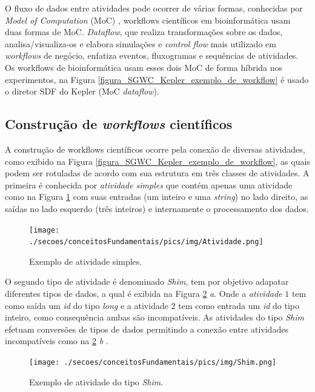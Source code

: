 O fluxo de dados entre atividades pode ocorrer de várias formas, conhecidas por \emph{Model of Computation} (MoC) \cite{Ludascher2006}, workflows científicos em bioinformática usam duas formas de MoC. \emph{Dataflow}, que realiza transformações sobre os dados, analisa/visualiza-os e elabora simulações e \emph{control flow} mais utilizado em \emph{workflows} de negócio, enfatiza eventos, fluxogramas e sequências de atividades. Os workflows de bioinformática usam esses dois MoC de forma híbrida nos experimentos, na Figura \ref{figura_SGWC_Kepler_exemplo_de_workflow} é usado o diretor SDF do Kepler (MoC \emph{dataflow}).

\subsection{Construção de \emph{workf\mbox{}lows} científ\mbox{}icos}
A construção de workflows científicos ocorre pela conexão de diversas atividades, como exibido na Figura \ref{figura_SGWC_Kepler_exemplo_de_workflow}, as quais podem ser rotuladas de acordo com sua estrutura em três classes de atividades. A primeira é conhecida por \emph{atividade simples} que contém apenas uma atividade  \cite{Garijo2012} como na Figura \ref{figura_atividade_simples} com suas entradas (um inteiro e uma \emph{string}) no lado direito, as saídas no lado esquerdo (três inteiros) e internamente o processamento dos dados.
\begin{figure}[!htb]
    \centering  
    \caption{Exemplo de atividade simples.}
    \texttt{[image: ./secoes/conceitosFundamentais/pics/img/Atividade.png]}    
	\label{figura_atividade_simples}
\end{figure}

O segundo tipo de atividade é denominado \emph{Shim}, tem por objetivo adapatar diferentes tipos de dados, a qual é exibida na Figura \ref{figura_atividade_shim} \emph{a}. Onde a \emph{atividade} \(1\) tem como saída um \emph{id} do tipo \emph{long} e a atividade \(2\) tem como entrada um \emph{id} do tipo inteiro, como consequência ambas são incompatíveis. As atividades do tipo \emph{Shim} efetuam conversões de tipos de dados permitindo a conexão entre atividades incompatíveis como na \ref{figura_atividade_shim} \emph{b} \cite{Lin2009}.
\begin{figure}[!htb]
    \centering  
    \caption{Exemplo de atividade do tipo \emph{Shim}.}
    \texttt{[image: ./secoes/conceitosFundamentais/pics/img/Shim.png]}    
	\label{figura_atividade_shim}
\end{figure}

